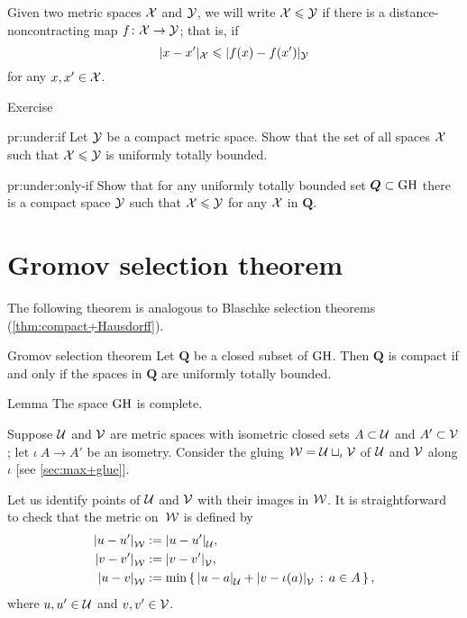 Given two metric spaces $\mathcal{X}$ and $\mathcal{Y}$, we will write $\mathcal{X}\leqslant \mathcal{Y}$ if there is a distance-noncontracting map $f\colon\mathcal{X}\to \mathcal{Y}$;
that is, if 
$$ |x-x'|_{\mathcal{X}}\leqslant|f(x)-f(x')|_{\mathcal{Y}}$$
for any $x,x'\in \mathcal{X}$.

\begin{thm}{Exercise}\label{pr:under}

\begin{subthm}{pr:under:if}
Let $\mathcal{Y}$ be a compact metric space.
Show that the set of all spaces $\mathcal{X}$ such that $\mathcal{X}\leqslant\mathcal{Y}$
is uniformly totally bounded.
\end{subthm}

\begin{subthm}{pr:under:only-if}
Show that for any uniformly totally bounded set $\bm{Q}\subset\operatorname{\rm GH}\nolimits$ there is a compact space $\mathcal{Y}$
such that $\mathcal{X}\leqslant\mathcal{Y}$ for any $\mathcal{X}$ in $\bm{Q}$.
\end{subthm}

\end{thm}

\section{Gromov selection theorem}

The following theorem is analogous to Blaschke selection theorems (\ref{thm:compact+Hausdorff}).

\begin{thm}{Gromov selection theorem}\label{thm:gromov-compactness}
Let $\bm{Q}$ be a closed subset of $\operatorname{\rm GH}\nolimits$.
Then $\bm{Q}$ is compact if and only if the spaces in $\bm{Q}$ are uniformly totally bounded.
\end{thm}

\begin{thm}{Lemma}\label{lem:GH-complete}
The space $\operatorname{\rm GH}\nolimits$ is complete.
\end{thm}

Suppose 
$\mathcal{U}$ and $\mathcal{V}$ are metric spaces 
with isometric closed sets $A\subset\mathcal{U}$ and $A'\subset\mathcal{V}$;
let $\iota\:A\to A'$ be an isometry.
Consider the gluing $\mathcal{W}=\mathcal{U}\sqcup_\iota\mathcal{V}$ of $\mathcal{U}$ and $\mathcal{V}$ along $\iota$ [see \ref{sec:max+glue}].

Let us identify points of $\mathcal{U}$ and $\mathcal{V}$ with their images in $\mathcal{W}$.
It is straightforward to check that the metric on~$\mathcal{W}$ is defined by
\begin{align*}
\dist{u}{u'}{\spc{W}}&\df\dist{u}{u'}{\spc{U}},
\\
\dist{v}{v'}{\spc{W}}&\df\dist{v}{v'}{\spc{V}},
\\
\dist{u}{v}{\spc{W}}&\df\min\set{\dist{u}{a}{\spc{U}}+\dist{v}{\iota(a)}{\spc{V}}}{a\in A},
\end{align*}
where $u,u'\in \mathcal{U}$ and $v,v'\in \mathcal{V}$.


